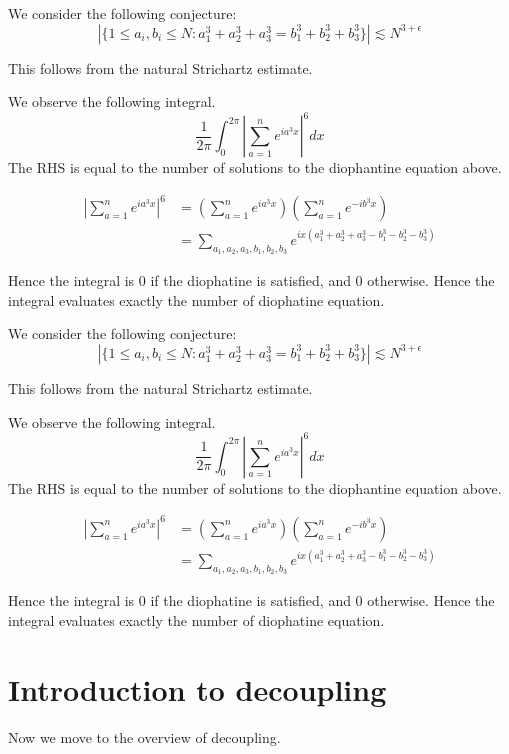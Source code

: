 We consider the following conjecture:
\begin{equation*}
    |\{1\leq a_i, b_i\leq N: a_1^3+a_2^3+a_3^3=b_1^3+b_2^3+b_3^3\}|\lesssim N^{3+\epsilon}
\end{equation*}

This follows from the natural Strichartz estimate. 

We observe the following integral.
\begin{equation*}
    \frac{1}{2\pi}\int_0^{2\pi}\left|\sum_{a=1}^ne^{ia^3x}\right|^6dx
\end{equation*}
The RHS is equal to the number of solutions to the diophantine equation above.

\begin{align*}
    \left|\sum_{a=1}^ne^{ia^3x}\right|^6&=(\sum_{a=1}^ne^{ia^3x})(\sum_{a=1}^ne^{-ib^3x})\\
    &=\sum_{a_1, a_2, a_3, b_1, b_2, b_3}e^{ix(a_1^3+a_2^3+a_3^3-b_1^3-b_2^3-b_3^3)}
\end{align*}

Hence the integral is 0 if the diophatine is satisfied, and 0 otherwise. Hence the integral evaluates exactly the number of diophatine equation. 

We consider the following conjecture:
\begin{equation*}
    |\{1\leq a_i, b_i\leq N: a_1^3+a_2^3+a_3^3=b_1^3+b_2^3+b_3^3\}|\lesssim N^{3+\epsilon}
\end{equation*}

This follows from the natural Strichartz estimate. 

We observe the following integral.
\begin{equation*}
    \frac{1}{2\pi}\int_0^{2\pi}\left|\sum_{a=1}^ne^{ia^3x}\right|^6dx
\end{equation*}
The RHS is equal to the number of solutions to the diophantine equation above.

\begin{align*}
    \left|\sum_{a=1}^ne^{ia^3x}\right|^6&=(\sum_{a=1}^ne^{ia^3x})(\sum_{a=1}^ne^{-ib^3x})\\
    &=\sum_{a_1, a_2, a_3, b_1, b_2, b_3}e^{ix(a_1^3+a_2^3+a_3^3-b_1^3-b_2^3-b_3^3)}
\end{align*}

Hence the integral is 0 if the diophatine is satisfied, and 0 otherwise. Hence the integral evaluates exactly the number of diophatine equation. 

\section*{Introduction to decoupling}
Now we move to the overview of decoupling.

